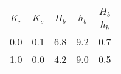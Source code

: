 \begin{tabular}{ccccc}
$K_{r}$ & $K_{s}$ & $H_{b}$ & $h_{b}$ & $\dfrac{H_{b}}{h_{b}}$ \\
\hline
0.0 & 0.1 & 6.8 & 9.2 & 0.7 \\
1.0 & 0.0 & 4.2 & 9.0 & 0.5 \\
\hline
\end{tabular}
